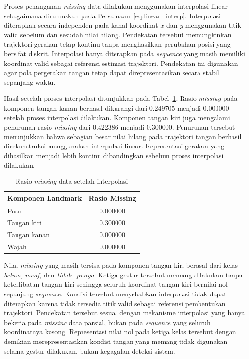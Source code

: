 Proses penanganan \textit{missing} data dilakukan menggunakan interpolasi linear sebagaimana dirumuskan pada Persamaan~\ref{eq:linear_interp}. 
Interpolasi diterapkan secara independen pada kanal koordinat $x$ dan $y$ menggunakan titik valid sebelum dan sesudah nilai hilang. 
Pendekatan tersebut memungkinkan trajektori gerakan tetap kontinu tanpa menghasilkan perubahan posisi yang bersifat diskrit. 
Interpolasi hanya diterapkan pada \textit{sequence} yang masih memiliki koordinat valid sebagai referensi estimasi trajektori. 
Pendekatan ini digunakan agar pola pergerakan tangan tetap dapat direpresentasikan secara stabil sepanjang waktu.

Hasil setelah proses interpolasi ditunjukkan pada Tabel~\ref{tab:4-missing-after}. 
Rasio \textit{missing} pada komponen tangan kanan berhasil dikurangi dari 0.249705 menjadi 0.000000 setelah proses interpolasi dilakukan. 
Komponen tangan kiri juga mengalami penurunan rasio \textit{missing} dari 0.422386 menjadi 0.300000. 
Penurunan tersebut menunjukkan bahwa sebagian besar nilai hilang pada trajektori tangan berhasil direkonstruksi menggunakan interpolasi linear. 
Representasi gerakan yang dihasilkan menjadi lebih kontinu dibandingkan sebelum proses interpolasi dilakukan.

\begin{table}[H]
\centering
\caption{Rasio \textit{missing} data setelah interpolasi}
\label{tab:4-missing-after}
\begin{tabular}{|l|c|}
\hline
\textbf{Komponen Landmark} & \textbf{Rasio Missing} \\ \hline
Pose & 0.000000 \\ \hline
Tangan kiri & 0.300000 \\ \hline
Tangan kanan & 0.000000 \\ \hline
Wajah & 0.000000 \\ \hline
\end{tabular}
\end{table}

Nilai \textit{missing} yang masih tersisa pada komponen tangan kiri berasal dari kelas \textit{belum}, \textit{maaf}, dan \textit{tidak\_punya}. 
Ketiga gestur tersebut memang dilakukan tanpa keterlibatan tangan kiri sehingga seluruh koordinat tangan kiri bernilai nol sepanjang \textit{sequence}. 
Kondisi tersebut menyebabkan interpolasi tidak dapat diterapkan karena tidak tersedia titik valid sebagai referensi pembentukan trajektori. 
Pendekatan tersebut sesuai dengan mekanisme interpolasi yang hanya bekerja pada \textit{missing} data parsial, bukan pada \textit{sequence} yang seluruh koordinatnya kosong. 
Representasi nilai nol pada ketiga kelas tersebut dengan demikian merepresentasikan kondisi tangan yang memang tidak digunakan selama gestur dilakukan, bukan kegagalan deteksi sistem.

